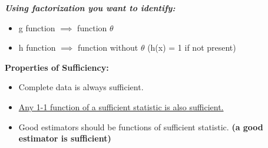 \documentclass[]{article}
\begin{document}
\newline
\newline \textbf{\textit{Using factorization you want to identify:}}
\begin{itemize}
	\item g function $\implies$ function $\theta$
	\item h function $\implies$ function without $\theta$ \newline (h(x) = 1 if not present)
\end{itemize}
\textbf{Properties of Sufficiency:}
\begin{itemize}
	\item Complete  data is always sufficient.
	\item \ul{Any 1-1 function of a sufficient statistic is also sufficient.}
	\item Good estimators should be functions of sufficient statistic. \newline\textbf{(a good estimator is sufficient)} 
\end{itemize}

\newpage
\end{document}

